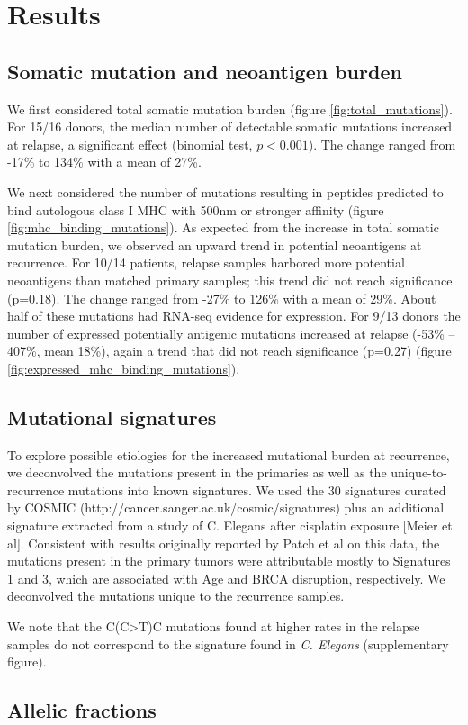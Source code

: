 \section*{Results}
\subsection*{Somatic mutation and neoantigen burden}

We first considered total somatic mutation burden (figure \ref{fig:total_mutations}). For 15/16 donors, the median number of detectable somatic mutations increased at relapse, a significant effect (binomial test, $p \lt 0.001$). The change ranged from -17\% to 134\% with a mean of 27\%.

We next considered the number of mutations resulting in peptides predicted to bind autologous class I MHC with 500nm or stronger affinity (figure \ref{fig:mhc_binding_mutations}). As expected from the increase in total somatic mutation burden, we observed an upward trend in potential neoantigens at recurrence. For 10/14 patients, relapse samples harbored more potential neoantigens than matched primary samples; this trend did not reach significance (p=0.18). The change ranged from -27\% to 126\% with a mean of 29\%. About half of these mutations had RNA-seq evidence for expression. For 9/13 donors the number of expressed potentially antigenic mutations increased at relapse (-53\% -- 407\%, mean 18\%), again a trend that did not reach significance (p=0.27) (figure \ref{fig:expressed_mhc_binding_mutations}).


\subsection*{Mutational signatures}
To explore possible etiologies for the increased mutational burden at recurrence, we deconvolved the mutations present in the primaries as well as the unique-to-recurrence mutations into known signatures. We used the 30 signatures curated by COSMIC (http://cancer.sanger.ac.uk/cosmic/signatures) plus an additional signature extracted from a study of C. Elegans after cisplatin exposure [Meier et al]. Consistent with results originally reported by Patch et al on this data, the mutations present in the primary tumors were attributable mostly to Signatures 1 and 3, which are associated with Age and BRCA disruption, respectively. We deconvolved the mutations unique to the recurrence samples. 

We note that the C(C>T)C mutations found at higher rates in the relapse samples do not correspond to the signature found in \textit{C. Elegans} (supplementary figure).

\subsection*{Allelic fractions}



